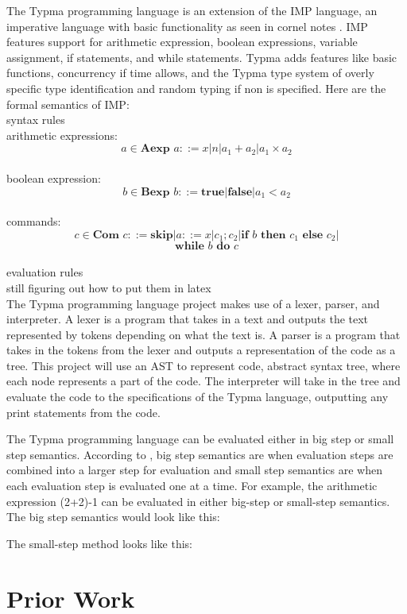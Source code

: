 \documentclass[10pt,twocolumn]{article}
\begin{document}
The Typma programming language is an extension of the IMP language, an imperative language with basic functionality as seen in cornel notes \textcite{CS4110IMP}. IMP features support for arithmetic expression, boolean expressions, variable assignment, if statements, and while statements. Typma adds features like basic functions, concurrency if time allows, and the Typma type system of overly specific type identification and random typing if non is specified. Here are the formal semantics of IMP:
\\
syntax rules
\\
arithmetic expressions: \[a \in \textbf{Aexp } a ::= x | n | a_1 + a_2 | a_1 \times a_2\] 
\\
boolean expression: \[b \in \textbf{Bexp } b ::= \textbf{true} | \textbf{false} | a_1 < a_2\] 
\\
commands:   \[c \in \textbf{Com } c ::= \textbf{skip} | a ::= x | c_1;c_2 | \textbf{if } b \textbf{ then } c_1 \textbf{ else } c_2 |\] \[\textbf{while } b \textbf{ do } c \] 
\\
evaluation rules
\\
still figuring out how to put them in latex
\\
The Typma programming language project makes use of a lexer, parser, and interpreter. A lexer is a program that takes in a text and outputs the text represented by tokens depending on what the text is. A parser is a program that takes in the tokens from the lexer and outputs a representation of the code as a tree. This project will use an AST to represent code, abstract syntax tree, where each node represents a part of the code. The interpreter will take in the tree and evaluate the code to the specifications of the Typma language, outputting any print statements from the code.

The Typma programming language can be evaluated either in big step or small step semantics. According to \textcite{CS4110IMP}, big step semantics are when evaluation steps are combined into a larger step for evaluation and small step semantics are when each evaluation step is evaluated one at a time. For example, the arithmetic expression (2+2)-1 can be evaluated in either big-step or small-step semantics. The big step semantics would look like this:

The small-step method looks like this:

\section{Prior Work}
\end{document}
